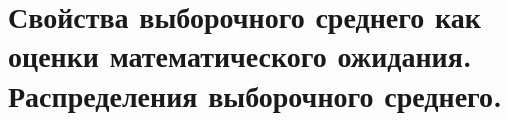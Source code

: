 \documentclass[polytech/stats/exam-2023/stats-exam-2023.tex]{subfiles}
\begin{document}
\section{Свойства выборочного среднего как оценки математического ожидания. Распределения выборочного среднего.}
\end{document}
